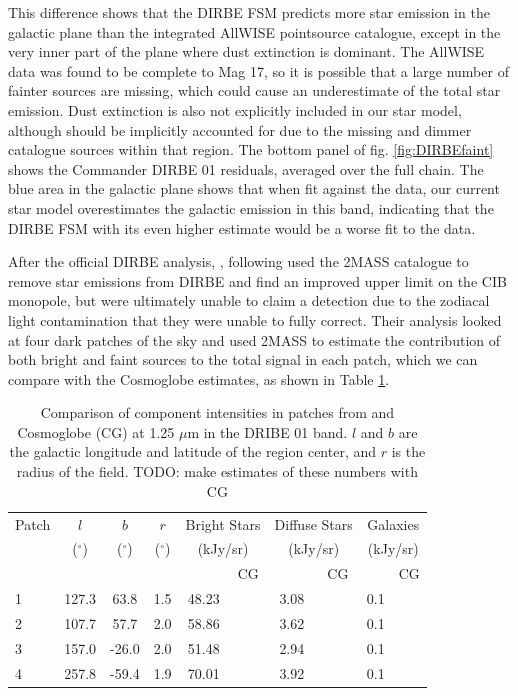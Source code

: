 \documentclass{aa}
\begin{document}
This difference shows that the DIRBE FSM predicts more star emission in the galactic plane than the integrated AllWISE pointsource catalogue, except in the very inner part of the plane where dust extinction is dominant. The AllWISE data was found to be complete to Mag 17, so it is possible that a large number of fainter sources are missing, which could cause an underestimate of the total star emission. Dust extinction is also not explicitly included in our star model, although should be implicitly accounted for due to the missing and dimmer catalogue sources within that region. The bottom panel of fig. \ref{fig:DIRBEfaint} shows the Commander DIRBE 01 residuals, averaged over the full chain. The blue area in the galactic plane shows that when fit against the data, our current star model overestimates the galactic emission in this band, indicating that the DIRBE FSM with its even higher estimate would be a worse fit to the data. 

After the official DIRBE analysis, \cite{DIRBE2mass}, following \cite{gorjian} used the 2MASS catalogue to remove star emissions from DIRBE and find an improved upper limit on the CIB monopole, but were ultimately unable to claim a detection due to the zodiacal light contamination that they were unable to fully correct. Their analysis looked at four dark patches of the sky and used 2MASS to estimate the contribution of both bright and faint sources to the total signal in each patch, which we can compare with the Cosmoglobe estimates, as shown in Table \ref{tab:2mass}.

\begin{table}
    \centering
    \begin{tabular}{l c c c c c c c c c}
    \hline
    \hline
     Patch & $l$ & $b$ & $r$ & \multicolumn{2}{c}{Bright Stars} & \multicolumn{2}{c}{Diffuse Stars} & \multicolumn{2}{c}{Galaxies} \\ 
     & ($^{\circ}$) & ($^{\circ}$) & ($^{\circ}$) & \multicolumn{2}{c}{(kJy/sr)} & \multicolumn{2}{c}{(kJy/sr)} & \multicolumn{2}{c}{(kJy/sr)} \\
          &  & & & \cite{DIRBE2mass} & CG & \cite{DIRBE2mass} & CG & \cite{DIRBE2mass} & CG\\
    
     \hline
     1 \rule{0pt}{2ex} & 127.3 & 63.8  & 1.5 & 48.23 & & 3.08 & & 0.1 &\\
     2 & 107.7 & 57.7 & 2.0 & 58.86 & & 3.62 & & 0.1 &\\
     3 & 157.0 & -26.0 & 2.0 & 51.48 & & 2.94 & & 0.1 &\\
     4 & 257.8 & -59.4 & 1.9 & 70.01 & & 3.92 & & 0.1 &\\
     \hline
    \end{tabular}
    \caption{Comparison of component intensities in patches from \cite{DIRBE2mass} and Cosmoglobe (CG) at 1.25 $\mu$m in the DRIBE 01 band. $l$ and $b$ are the galactic longitude and latitude of the region center, and $r$ is the radius of the field. TODO: make estimates of these numbers with CG}
    \label{tab:2mass}
\end{table}
\end{document}
